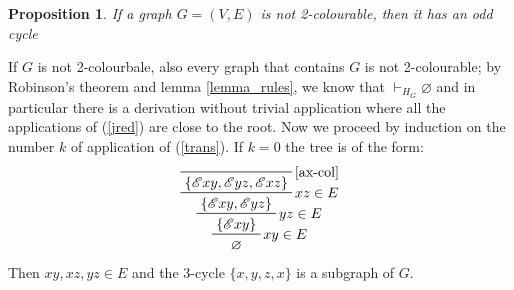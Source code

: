 \documentclass[a4paper,12pt,twoside]{book}
\newtheorem{proposition}[theorem]{Proposition}
\newcommand{\E}{\mathscr{E}}
\let\emptyset\varnothing
\begin{document}
\begin{proposition}
If a graph $G=(V,E)$ is not 2-colourable, then it has an odd cycle
\end{proposition}
If $G$ is not 2-colourbale, also every graph that contains $G$ is not 2-colourable; by Robinson's theorem and lemma \ref{lemma_rules}, we know that  $\vdash_{H_G} \emptyset$ and in particular there is a derivation without trivial application where all the applications of (\ref{jred}) are close to the root.
Now we proceed by induction on the number $k$ of application of (\ref{trans}).
If $k=0$ the tree is of the form:
\begin{eqnarray*}
\prftree[r]{$xy \in E$}{
\prftree[r]{$yz \in E$}{
\prftree[r]{$xz \in E$}{
\prftree[r]{\ref{ax-col}} { }{ \{ \E xy , \E yz, \E xz  \} } } 
{\{ \E xy , \E yz \} } } 
{\{\E xy \} } }
{ \emptyset }
\end{eqnarray*}
Then $xy,xz,yz \in E$ and the 3-cycle $\{x,y,z,x\}$ is a subgraph of $G$.
 
\end{document}
